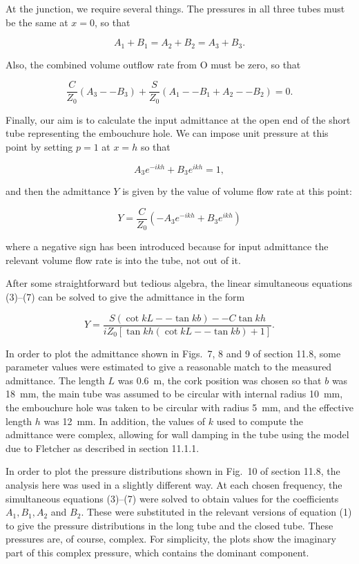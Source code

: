   At the junction, we require several things. The pressures in all three tubes 
  must be the same at $x=0$, so that 

  $$A_1+B_1 = A_2 + B_2 = A_3 + B_3 . \tag{5}$$ 

  Also, the combined volume outflow rate from O must be zero, so that 

  $$\dfrac{C}{Z_0}(A_3 -- B_3) + \dfrac{S}{Z_0}(A_1 -- B_1 + A_2 -- B_2) = 0 . 
  \tag{6}$$ 

  Finally, our aim is to calculate the input admittance at the open end of the 
  short tube representing the embouchure hole. We can impose unit pressure at 
  this point by setting $p=1$ at $x=h$ so that 

  $$A_3 e^{-ikh} + B_3 e^{ikh} =1, \tag{7}$$ 

  and then the admittance $Y$ is given by the value of volume flow rate at this 
  point: 

  $$Y=\dfrac{C}{Z_0}\left( -A_3 e^{-ikh} + B_3 e^{ikh} \right) \tag{8}$$ 

  where a negative sign has been introduced because for input admittance the 
  relevant volume flow rate is into the tube, not out of it. 

  After some straightforward but tedious algebra, the linear simultaneous 
  equations (3)--(7) can be solved to give the admittance in the form 

  $$Y = \dfrac{S (\cot kL -- \tan kb ) -- C \tan kh}{i Z_0 \left[ \tan kh (\cot 
  kL -- \tan kb ) +1 \right]} . \tag{9}$$ 

  In order to plot the admittance shown in Figs.\ 7, 8 and 9 of section 11.8, 
  some parameter values were estimated to give a reasonable match to the 
  measured admittance. The length $L$ was 0.6 m, the cork position was chosen 
  so that $b$ was 18 mm, the main tube was assumed to be circular with internal 
  radius 10 mm, the embouchure hole was taken to be circular with radius 5 mm, 
  and the effective length $h$ was 12 mm. In addition, the values of $k$ used 
  to compute the admittance were complex, allowing for wall damping in the tube 
  using the model due to Fletcher as described in section 11.1.1. 

  In order to plot the pressure distributions shown in Fig.\ 10 of section 
  11.8, the analysis here was used in a slightly different way. At each chosen 
  frequency, the simultaneous equations (3)--(7) were solved to obtain values 
  for the coefficients $A_1, B_1, A_2$ and $B_2$. These were substituted in the 
  relevant versions of equation (1) to give the pressure distributions in the 
  long tube and the closed tube. These pressures are, of course, complex. For 
  simplicity, the plots show the imaginary part of this complex pressure, which 
  contains the dominant component. 